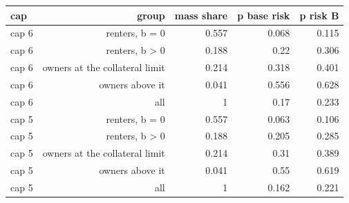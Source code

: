 \begin{tabular}{lrrrr}
\toprule
cap & group & mass share & p base risk & p risk B \\
\midrule
cap 6 & renters, b = 0 & 0.557 & 0.068 & 0.115 \\
cap 6 & renters, b > 0 & 0.188 & 0.22 & 0.306 \\
cap 6 & owners at the collateral limit & 0.214 & 0.318 & 0.401 \\
cap 6 & owners above it & 0.041 & 0.556 & 0.628 \\
cap 6 & all & 1 & 0.17 & 0.233 \\
cap 5 & renters, b = 0 & 0.557 & 0.063 & 0.106 \\
cap 5 & renters, b > 0 & 0.188 & 0.205 & 0.285 \\
cap 5 & owners at the collateral limit & 0.214 & 0.31 & 0.389 \\
cap 5 & owners above it & 0.041 & 0.55 & 0.619 \\
cap 5 & all & 1 & 0.162 & 0.221 \\
\bottomrule
\end{tabular}
